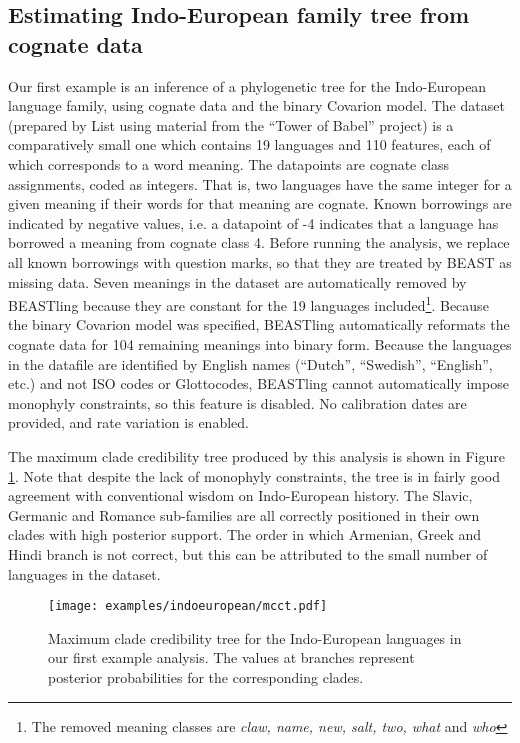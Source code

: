 \documentclass[twocolumn,10pt]{scrartcl}
\begin{document}
\subsection{Estimating Indo-European family tree from cognate data}

Our first example is an inference of a phylogenetic tree for the Indo-European language family, using cognate data and the binary Covarion model.  The dataset\cite{List2014a} (prepared by List\cite{List2014} using material from the ``Tower of Babel'' project\cite{Starostin2008}) is a comparatively small one which contains 19 languages and 110 features, each of which corresponds to a word meaning.  The datapoints are cognate class assignments, coded as integers.  That is, two languages have the same integer for a given meaning if their words for that meaning are cognate.  Known borrowings are indicated by negative values, i.e. a datapoint of -4 indicates that a language has borrowed a meaning from cognate class 4.  Before running the analysis, we replace all known borrowings with question marks, so that they are treated by BEAST as missing data.  Seven meanings in the dataset are automatically removed by BEASTling because they are constant for the 19 languages included\footnote{The removed meaning classes are \emph{claw, name, new, salt, two, what} and \emph{who}}.  Because the binary Covarion model was specified, BEASTling automatically reformats the cognate data for 104 remaining meanings into binary form.  Because the languages in the datafile are identified by English names (``Dutch'', ``Swedish'', ``English'', etc.) and not ISO codes or Glottocodes, BEASTling cannot automatically impose monophyly constraints, so this feature is disabled.  No calibration dates are provided, and rate variation is enabled.

The maximum clade credibility tree produced by this analysis is shown in Figure \ref{fig:ie}.  Note that despite the lack of monophyly constraints, the tree is in fairly good agreement with conventional wisdom on Indo-European history.  The Slavic, Germanic and Romance sub-families are all correctly positioned in their own clades with high posterior support.  The order in which Armenian, Greek and Hindi branch is not correct, but this can be attributed to the small number of languages in the dataset.

\begin{figure}[t]
	\begin{center}
	\texttt{[image: examples/indoeuropean/mcct.pdf]}
	\end{center}
	\caption{Maximum clade credibility tree for the Indo-European languages in our first example analysis.  The values at branches represent posterior probabilities for the corresponding clades.}
\label{fig:ie}
\end{figure}
\end{document}
